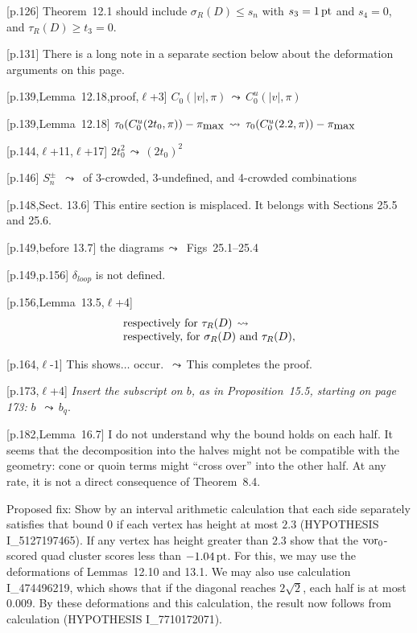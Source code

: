 \documentclass[11pt]{amsart}
\def\op#1{{\text{#1}}}
\def\lto{\ensuremath{\,\leadsto\,}}
\def\line{$\ell$}
\def\text{\hbox}
\begin{document}
[p.126] 
Theorem~12.1 should include $\sigma_R(D)\le s_n$
with $s_3 = 1\,\op{pt}$ and $s_4=0$, and
$\tau_R(D) \ge t_3 = 0$.

[p.131] There is a long note in a separate section below about
the deformation arguments on this page.


[p.139,Lemma~12.18,proof,\line+3] 
	$C_0(|v|,\pi) \lto
	C_0^u(|v|,\pi)
	$
	
[p.139,Lemma~12.18] 
	$
	\tau_0(C_0^u(2t_0,\pi))-\pi_{\text{max}}\lto
	\tau_0(C_0^u(2.2,\pi))-\pi_{\text{max}}
	$

[p.144,\line+11,\line+17]
	$2t_0^2 \lto (2t_0)^2
	$

[p.146]
		$S_n^\pm$ \lto
	of 3-crowded, 3-undefined, and
	4-crowded combinations

[p.148,Sect. 13.6]  This entire
section is misplaced.  It belongs with
Sections 25.5 and 25.6.

[p.149,before 13.7]
the diagrams\lto
	Figs~25.1--25.4

[p.149,p.156] $\delta_{loop}$ is not defined.

[p.156,Lemma~13.5,\line+4]
	$$
	\begin{array}{lll}
	\text{respectively for }\tau_R(D)\lto\\
	\text{respectively, for }\sigma_R(D) \text{ and }
	\tau_R(D),  
	\end{array}
	$$

[p.164,\line-1] 
	This shows$\ldots$ occur.
	\lto This completes the proof.


[p.173,\line+4] {\it Insert the subscript on $b$,
as in Proposition~15.5, starting on page 173:}
   $b$ \lto $b_q$.



	
[p.182,Lemma~16.7]  I do not understand why
the bound holds on each half.  It seems that
the decomposition into the halves might not be
compatible with the geometry: cone or quoin
terms might ``cross over'' into the other half.
At any rate, it is not a direct consequence
of Theorem~8.4.

Proposed fix: Show by an interval arithmetic
calculation that each side separately satisfies
that bound $0$ if each vertex has height at most $2.3$ (HYPOTHESIS I\_5127197465).
If any vertex has height greater than $2.3$ show that the $\op{vor}_0$-scored quad cluster scores
less than $-1.04\,\op{pt}$.  For this, we may use the deformations of Lemmas~12.10 and 13.1.  We may also use calculation I\_474496219, which shows that if the diagonal reaches $2\sqrt2$, each half is at most $0.009$.  By these deformations and this calculation, the result now follows from calculation (HYPOTHESIS I\_7710172071).
\end{document}

